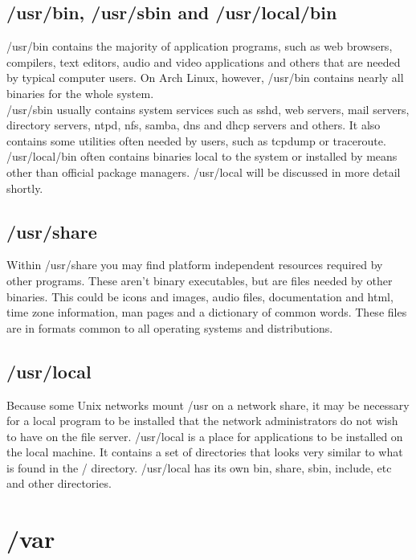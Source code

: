 \subsection{/usr/bin, /usr/sbin and /usr/local/bin}

/usr/bin contains the majority of application programs, such as web browsers, compilers, text editors, audio and video applications and others that are needed by typical computer users.  On Arch Linux, however, /usr/bin contains nearly all binaries for the whole system.\\

/usr/sbin usually contains system services such as sshd, web servers, mail servers, directory servers, ntpd, nfs, samba, dns and dhcp servers and others.  It also contains some utilities often needed by users, such as tcpdump or traceroute.\\

/usr/local/bin often contains binaries local to the system or installed by means other than official package managers.  /usr/local will be discussed in more detail shortly.

\subsection{/usr/share}

Within /usr/share you may find platform independent resources required by other programs.  These aren't binary executables, but are files needed by other binaries.  This could be icons and images, audio files, documentation and html, time zone information, man pages and a dictionary of common words.  These files are in formats common to all operating systems and distributions.

\subsection{/usr/local}

Because some Unix networks mount /usr on a network share, it may be necessary for a local program to be installed that the network administrators do not wish to have on the file server.  /usr/local is a place for applications to be installed on the local machine.  It contains a set of directories that looks very similar to what is found in the / directory.  /usr/local has its own bin, share, sbin, include, etc and other directories.

\section{/var}

